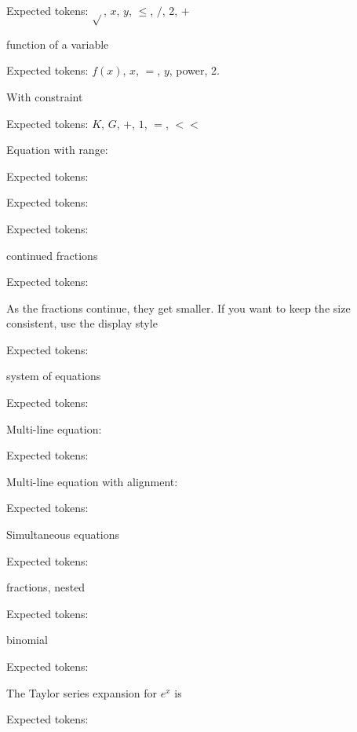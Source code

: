 \documentclass{article}
\begin{document}
\hrulefill


    
Expected tokens: $\sqrt{}$, $x$, $y$, $\leq$, $/$, 2, $+$

\hrulefill


function of a variable
    
Expected tokens: $f(x)$, $x$, $=$, $y$, power, 2.

\hrulefill


With constraint
    
Expected tokens: $K$, $G$, $+$, $1$, $=$, $<<$

\hrulefill


Equation with range:
    
Expected tokens: 

\hrulefill



Expected tokens: 

\hrulefill



Expected tokens: 

\hrulefill

continued fractions
    
Expected tokens: 

\hrulefill

As the fractions continue, they get smaller. If you want to keep the size consistent, use the display style
    
Expected tokens: 

\hrulefill

system of equations

Expected tokens: 

\hrulefill

Multi-line equation:
    
Expected tokens: 

\hrulefill

Multi-line equation with alignment:

Expected tokens: 

\hrulefill

Simultaneous equations

Expected tokens: 

\hrulefill

fractions, nested

Expected tokens: 

\hrulefill

binomial

Expected tokens: 

\hrulefill

The Taylor series expansion for $e^x$ is 

Expected tokens: 
\end{document}
